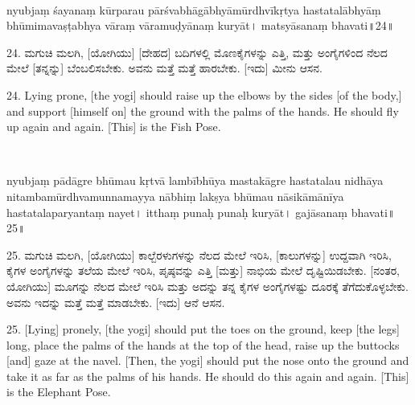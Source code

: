 ~\vskip 1cm

\dummyimage
\begin{sans}
nyubjaṃ śayanaṃ kūrparau pārśvabhāgābhyāmūrdhvīkṛtya hastatalābhyāṃ bhūmimavaṣṭabhya vāraṃ vāramuḍyānaṃ kuryāt\endnote{kuryāt~] P, kṛtvā M.}। matsyāsanaṃ bhavati॥24॥
\end{sans}
\bigskip

\begin{kan}
24.	ಮಗುಚಿ ಮಲಗಿ, [ಯೋಗಿಯು] [ದೇಹದ] ಬದಿಗಳಲ್ಲಿ ಮೊಣಕೈಗಳನ್ನು ಎತ್ತಿ, ಮತ್ತು ಅಂಗೈಗಳಿಂದ ನೆಲದ ಮೇಲೆ [ತನ್ನನ್ನು] ಬೆಂಬಲಿಸಬೇಕು. ಅವನು ಮತ್ತೆ ಮತ್ತೆ ಹಾರಬೇಕು. [ಇದು] ಮೀನು ಆಸನ.
\end{kan}
\bigskip

\begin{eng}
24. Lying prone, [the yogi] should raise up the elbows by the sides [of the body,] and support [himself on] the ground with the palms of the hands. He should fly up again and again. [This] is the Fish Pose.
\end{eng}
\newpage

~\vskip 1cm


\dummyimage
\begin{sans}
nyubjaṃ pādāgre bhūmau kṛtvā lambībhūya mastakāgre hastatalau nidhāya nitambamūrdhvamunnamayya nābhiṃ\endnote{nābhiṃ~] \textit{corr.}~: nābhi M.} lakṣya bhūmau nāsikāmānīya hastatalaparyantaṃ nayet। itthaṃ punaḥ punaḥ\endnote{punaḥ punaḥ~] P, punaḥ M.} kuryāt। gajāsanaṃ bhavati॥25॥
\end{sans}
\bigskip

\begin{kan}

25.	ಮಗುಚಿ ಮಲಗಿ, [ಯೋಗಿಯು] ಕಾಲ್ಬೆರಳುಗಳನ್ನು ನೆಲದ ಮೇಲೆ ಇರಿಸಿ, [ಕಾಲುಗಳನ್ನು] ಉದ್ದವಾಗಿ ಇರಿಸಿ, ಕೈಗಳ ಅಂಗೈಗಳನ್ನು ತಲೆಯ ಮೇಲೆ ಇರಿಸಿ, ಪೃಷ್ಠವನ್ನು ಎತ್ತಿ [ಮತ್ತು] ನಾಭಿಯ ಮೇಲೆ ದೃಷ್ಟಿಯಿಡಬೇಕು. [ನಂತರ, ಯೋಗಿಯು] ಮೂಗನ್ನು ನೆಲದ ಮೇಲೆ ಇರಿಸಿ ಮತ್ತು ಅದನ್ನು ತನ್ನ ಕೈಗಳ ಅಂಗೈಗಳಷ್ಟು ದೂರಕ್ಕೆ ತೆಗೆದುಕೊಳ್ಳಬೇಕು. ಅವನು ಇದನ್ನು ಮತ್ತೆ ಮತ್ತೆ ಮಾಡಬೇಕು. [ಇದು] ಆನೆ ಆಸನ.
\end{kan}
\bigskip

\begin{eng}
25. [Lying] pronely, [the yogi] should put the toes on the ground, keep [the legs] long, place the palms of the hands at the top of the head, raise up the buttocks [and] gaze at the navel. [Then, the yogi] should put the nose onto the ground and take it as far as the palms of his hands. He should do this again and again. [This] is the Elephant Pose.
\end{eng}
\newpage



